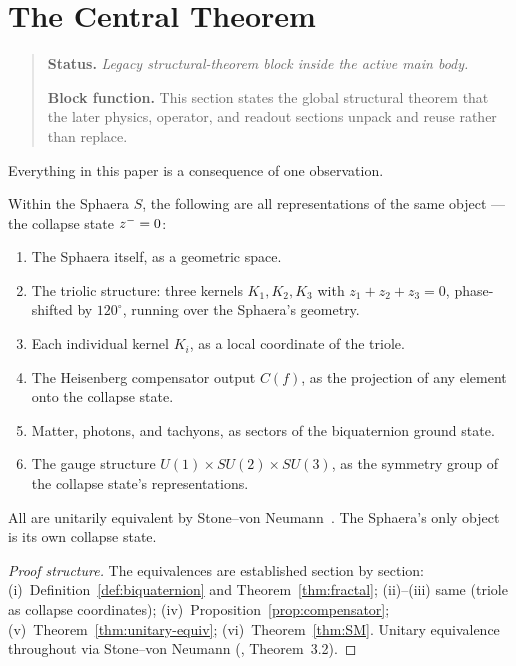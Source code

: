 \section{The Central Theorem}
\begin{quote}\small
\noindent\textbf{Status.} \emph{Legacy structural-theorem block inside the active main body.}\par
\noindent\textbf{Block function.} This section states the global structural theorem that the later physics, operator, and readout sections unpack and reuse rather than replace.
\end{quote}
\label{sec:central}

Everything in this paper is a consequence of one observation.

\begin{theorem}\label{thm:unity}
Within the Sphaera $S$, the following are all representations of the
same object --- the collapse state $z^-=0$:
\begin{enumerate}[label=(\roman*)]
 \item The Sphaera itself, as a geometric space.
 \item The triolic structure: three kernels $K_1,K_2,K_3$ with
 $z_1+z_2+z_3=0$, phase-shifted by $120^\circ$, running over the
 Sphaera's geometry.
 \item Each individual kernel $K_i$, as a local coordinate of the triole.
 \item The Heisenberg compensator output $C(f)$, as the projection of
 any element onto the collapse state.
 \item Matter, photons, and tachyons, as sectors of the biquaternion
 ground state.
 \item The gauge structure $U(1)\times SU(2)\times SU(3)$, as the
 symmetry group of the collapse state's representations.
\end{enumerate}
All are unitarily equivalent by Stone--von Neumann~\cite{brendecke2026rh}.
The Sphaera's only object is its own collapse state.
\end{theorem}

\begin{proof}[Proof structure]
The equivalences are established section by section:
(i)~Definition~\ref{def:biquaternion} and Theorem~\ref{thm:fractal};
(ii)--(iii) same (triole as collapse coordinates);
(iv)~Proposition~\ref{prop:compensator};
(v)~Theorem~\ref{thm:unitary-equiv};
(vi)~Theorem~\ref{thm:SM}.
Unitary equivalence throughout via Stone--von Neumann
(\cite{brendecke2026rh}, Theorem~3.2).
\end{proof}


